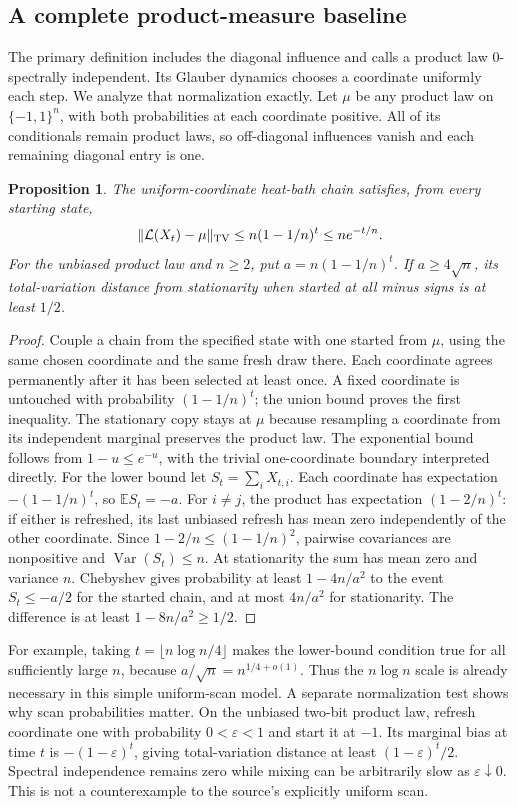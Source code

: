 \documentclass[11pt]{article}
\newtheorem{proposition}{Proposition}
\begin{document}
\subsection{A complete product-measure baseline}
The primary definition includes the diagonal influence and calls a product law 0-spectrally independent. Its Glauber dynamics chooses a coordinate uniformly each step. We analyze that normalization exactly. Let $\mu$ be any product law on $\{-1,1\}^n$, with both probabilities at each coordinate positive. All of its conditionals remain product laws, so off-diagonal influences vanish and each remaining diagonal entry is one.
\begin{proposition}
The uniform-coordinate heat-bath chain satisfies, from every starting state,
\[
\|\mathcal L(X_t)-\mu\|_{\rm TV}\le n(1-1/n)^t\le ne^{-t/n}.
\]
For the unbiased product law and $n\ge2$, put $a=n(1-1/n)^t$. If $a\ge4\sqrt n$, its total-variation distance from stationarity when started at all minus signs is at least $1/2$.
\end{proposition}
\begin{proof}
Couple a chain from the specified state with one started from $\mu$, using the same chosen coordinate and the same fresh draw there. Each coordinate agrees permanently after it has been selected at least once. A fixed coordinate is untouched with probability $(1-1/n)^t$; the union bound proves the first inequality. The stationary copy stays at $\mu$ because resampling a coordinate from its independent marginal preserves the product law. The exponential bound follows from $1-u\le e^{-u}$, with the trivial one-coordinate boundary interpreted directly.
For the lower bound let $S_t=\sum_i X_{t,i}$. Each coordinate has expectation $-(1-1/n)^t$, so $\mathbb ES_t=-a$. For $i\ne j$, the product has expectation $(1-2/n)^t$: if either is refreshed, its last unbiased refresh has mean zero independently of the other coordinate. Since $1-2/n\le(1-1/n)^2$, pairwise covariances are nonpositive and $\operatorname{Var}(S_t)\le n$. At stationarity the sum has mean zero and variance $n$. Chebyshev gives probability at least $1-4n/a^2$ to the event $S_t\le-a/2$ for the started chain, and at most $4n/a^2$ for stationarity. The difference is at least $1-8n/a^2\ge1/2$.
\end{proof}
For example, taking $t=\lfloor n\log n/4\rfloor$ makes the lower-bound condition true for all sufficiently large $n$, because $a/\sqrt n=n^{1/4+o(1)}$. Thus the $n\log n$ scale is already necessary in this simple uniform-scan model.
A separate normalization test shows why scan probabilities matter. On the unbiased two-bit product law, refresh coordinate one with probability $0<\varepsilon<1$ and start it at $-1$. Its marginal bias at time $t$ is $-(1-\varepsilon)^t$, giving total-variation distance at least $(1-\varepsilon)^t/2$. Spectral independence remains zero while mixing can be arbitrarily slow as $\varepsilon\downarrow0$. This is not a counterexample to the source's explicitly uniform scan.
\end{document}
